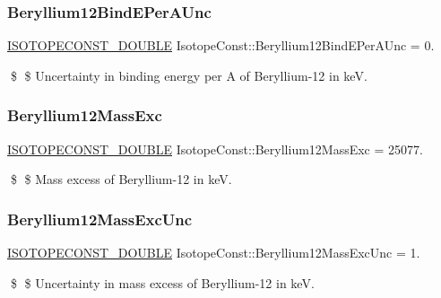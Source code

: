 \subsubsection{\texorpdfstring{Beryllium12\+Bind\+E\+Per\+A\+Unc}{Beryllium12BindEPerAUnc}}
{\footnotesize\ttfamily \mbox{\hyperlink{group___isotope_const-_macros_ga8f45a7272ce02c0b4c65c44636ed719a}{I\+S\+O\+T\+O\+P\+E\+C\+O\+N\+S\+T\+\_\+\+D\+O\+U\+B\+LE}} Isotope\+Const\+::\+Beryllium12\+Bind\+E\+Per\+A\+Unc = 0.}

\$ \$ Uncertainty in binding energy per A of Beryllium-\/12 in keV. \mbox{\label{group___isotope_const-_beryllium-_be12_gaa83b6e00dca8449860c70d8d1275adf3}} 
\subsubsection{\texorpdfstring{Beryllium12\+Mass\+Exc}{Beryllium12MassExc}}
{\footnotesize\ttfamily \mbox{\hyperlink{group___isotope_const-_macros_ga8f45a7272ce02c0b4c65c44636ed719a}{I\+S\+O\+T\+O\+P\+E\+C\+O\+N\+S\+T\+\_\+\+D\+O\+U\+B\+LE}} Isotope\+Const\+::\+Beryllium12\+Mass\+Exc = 25077.}

\$ \$ Mass excess of Beryllium-\/12 in keV. \mbox{\label{group___isotope_const-_beryllium-_be12_gab36eee76e5b0fe0da63111addb3c8f2b}} 
\subsubsection{\texorpdfstring{Beryllium12\+Mass\+Exc\+Unc}{Beryllium12MassExcUnc}}
{\footnotesize\ttfamily \mbox{\hyperlink{group___isotope_const-_macros_ga8f45a7272ce02c0b4c65c44636ed719a}{I\+S\+O\+T\+O\+P\+E\+C\+O\+N\+S\+T\+\_\+\+D\+O\+U\+B\+LE}} Isotope\+Const\+::\+Beryllium12\+Mass\+Exc\+Unc = 1.}

\$ \$ Uncertainty in mass excess of Beryllium-\/12 in keV. \mbox{\label{group___isotope_const-_beryllium-_be12_ga2284ea64341a2060eadc0064400bceb4}} 

